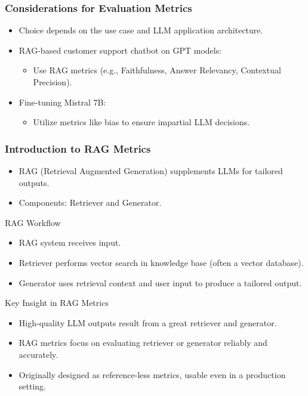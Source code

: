 \begin{frame}[fragile]\frametitle{Considerations for Evaluation Metrics}
  \begin{itemize}
    \item Choice depends on the use case and LLM application architecture.
    \item RAG-based customer support chatbot on GPT models:
      \begin{itemize}
        \item Use RAG metrics (e.g., Faithfulness, Answer Relevancy, Contextual Precision).
      \end{itemize}
    \item Fine-tuning Mistral 7B:
      \begin{itemize}
        \item Utilize metrics like bias to ensure impartial LLM decisions.
      \end{itemize}
  \end{itemize}
\end{frame}


\begin{frame}[fragile]\frametitle{Introduction to RAG Metrics}
  \begin{itemize}
    \item RAG (Retrieval Augmented Generation) supplements LLMs for tailored outputs.
    \item Components: Retriever and Generator.
  \end{itemize}

RAG Workflow
  \begin{itemize}
    \item RAG system receives input.
    \item Retriever performs vector search in knowledge base (often a vector database).
    \item Generator uses retrieval context and user input to produce a tailored output.
  \end{itemize}

Key Insight in RAG Metrics
  \begin{itemize}
    \item High-quality LLM outputs result from a great retriever and generator.
    \item RAG metrics focus on evaluating retriever or generator reliably and accurately.
    \item Originally designed as reference-less metrics, usable even in a production setting.
  \end{itemize}
\end{frame}

